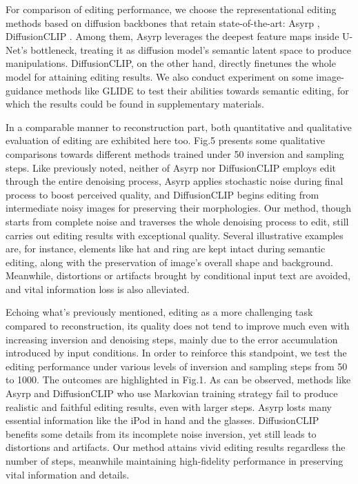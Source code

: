 \documentclass[letterpaper]{article} %
\begin{document}
For comparison of editing performance, we choose the representational editing methods based on diffusion backbones that retain state-of-the-art: Asyrp \cite{kwon2022diffusion}, DiffusionCLIP \cite{kim2022diffusionclip}. Among them, Asyrp leverages the deepest feature maps inside U-Net's bottleneck, treating it as diffusion model's semantic latent space to produce manipulations. DiffusionCLIP, on the other hand, directly finetunes the whole model for attaining editing results. We also conduct experiment on some image-guidance methods like GLIDE \cite{nichol2021glide} to test their abilities towards semantic editing, for which the results could be found in supplementary materials.

In a comparable manner to reconstruction part, both quantitative and qualitative evaluation of editing are exhibited here too. Fig.5 presents some qualitative comparisons towards different methods trained under 50 inversion and sampling steps. Like previously noted, neither of Asyrp nor DiffusionCLIP employs edit through the entire denoising process, Asyrp applies stochastic noise during final process to boost perceived quality, and DiffusionCLIP begins editing from intermediate noisy images for preserving their morphologies. Our method, though starts from complete noise and traverses the whole denoising process to edit, still carries out editing results with exceptional quality. Several illustrative examples are, for instance, elements like hat and ring are kept intact during semantic editing, along with the preservation of image's overall shape and background. Meanwhile, distortions or artifacts brought by conditional input text are avoided, and vital information loss is also alleviated.

Echoing what's previously mentioned, editing as a more challenging task compared to reconstruction, its quality does not tend to improve much even with increasing inversion and denoising steps, mainly due to the error accumulation introduced by input conditions. In order to reinforce this standpoint, we test the editing performance under various levels of inversion and sampling steps from 50 to 1000. The outcomes are highlighted in Fig.1. As can be observed, methods like Asyrp and DiffusionCLIP who use Markovian training strategy fail to produce realistic and faithful editing results, even with larger steps. Asyrp losts many essential information like the iPod in hand and the glasses. DiffusionCLIP benefits some details from its incomplete noise inversion, yet still leads to distortions and artifacts. Our method attains vivid editing results regardless the number of steps, meanwhile maintaining high-fidelity performance in preserving vital information and details.
\end{document}
